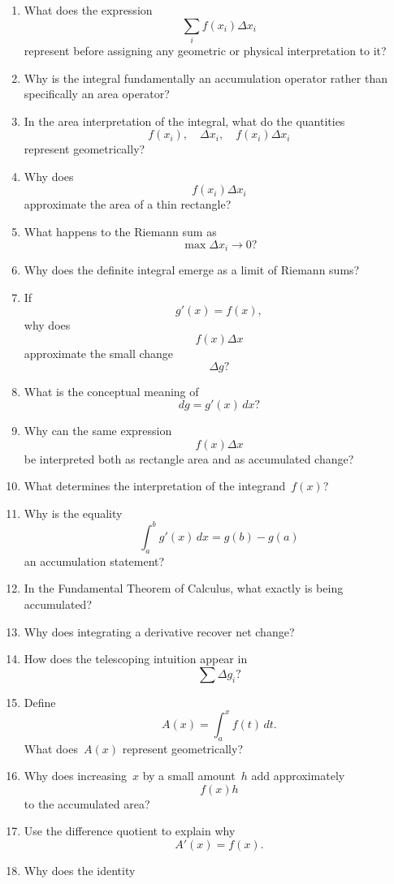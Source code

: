 \begin{enumerate}[resume]
  \item What does the expression
    \[
      \sum_i f(x_i)\Delta x_i
    \]
    represent before assigning any geometric or physical interpretation to it?
  \item Why is the integral fundamentally an accumulation operator rather than specifically an area operator?
  \item In the area interpretation of the integral, what do the quantities
    \[
      f(x_i), \quad \Delta x_i, \quad f(x_i)\Delta x_i
    \]
    represent geometrically?
  \item Why does
    \[
      f(x_i)\Delta x_i
    \]
    approximate the area of a thin rectangle?
  \item What happens to the Riemann sum as
    \[
      \max \Delta x_i \to 0?
    \]
  \item Why does the definite integral emerge as a limit of Riemann sums?
  \item If
    \[
      g'(x)=f(x),
    \]
    why does
    \[
      f(x)\Delta x
    \]
    approximate the small change
    \[
      \Delta g?
    \]
  \item What is the conceptual meaning of
    \[
      dg = g'(x)\,dx?
    \]
  \item Why can the same expression
    \[
      f(x)\Delta x
    \]
    be interpreted both as rectangle area and as accumulated change?
  \item What determines the interpretation of the integrand~\(f(x)\)?
  \item Why is the equality
    \[
      \int_a^b g'(x)\,dx = g(b)-g(a)
    \]
    an accumulation statement?
  \item In the Fundamental Theorem of Calculus, what exactly is being accumulated?
  \item Why does integrating a derivative recover net change?
  \item How does the telescoping intuition appear in
    \[
      \sum \Delta g_i?
    \]
  \item Define
    \[
      A(x)=\int_a^x f(t)\,dt.
    \]
    What does~\(A(x)\) represent geometrically?
  \item Why does increasing~\(x\) by a small amount~\(h\) add approximately
    \[
      f(x)h
    \]
    to the accumulated area?
  \item Use the difference quotient to explain why
    \[
      A'(x)=f(x).
    \]
  \item Why does the identity

\end{enumerate}
